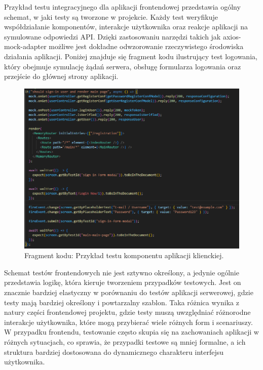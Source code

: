 \documentclass[12pt,a4paper]{article}
\begin{document}
\newpage

\noindent
Przykład testu integracyjnego dla aplikacji frontendowej przedstawia ogólny schemat, w jaki testy są tworzone w projekcie. Każdy test weryfikuje współdziałanie komponentów, interakcje użytkownika oraz reakcje aplikacji na symulowane odpowiedzi API. Dzięki zastosowaniu narzędzi takich jak axios-mock-adapter możliwe jest dokładne odwzorowanie rzeczywistego środowiska działania aplikacji. Poniżej znajduje się fragment kodu ilustrujący test logowania, który obejmuje symulację żądań serwera, obsługę formularza logowania oraz przejście do głównej strony aplikacji.

\vspace{0.5cm}
\begin{figure}[h!]
    \centering
    \includegraphics[width=1\textwidth]{images/ex_front_tests.png}
    \caption{Fragment kodu: Przykład testu komponentu aplikacji klienckiej.}
\end{figure}
\vspace{0.5cm}

\noindent
Schemat testów frontendowych nie jest sztywno określony, a jedynie ogólnie przedstawia logikę, która kieruje tworzeniem przypadków testowych. Jest on znacznie bardziej elastyczny w porównaniu do testów aplikacji serwerowej, gdzie testy mają bardziej określony i powtarzalny szablon. Taka różnica wynika z natury części frontendowej projektu, gdzie testy muszą uwzględniać różnorodne interakcje użytkownika, które mogą przybierać wiele różnych form i scenariuszy. W przypadku frontendu, testowanie często skupia się na zachowaniach aplikacji w różnych sytuacjach, co sprawia, że przypadki testowe są mniej formalne, a ich struktura bardziej dostosowana do dynamicznego charakteru interfejsu użytkownika.
\end{document}
